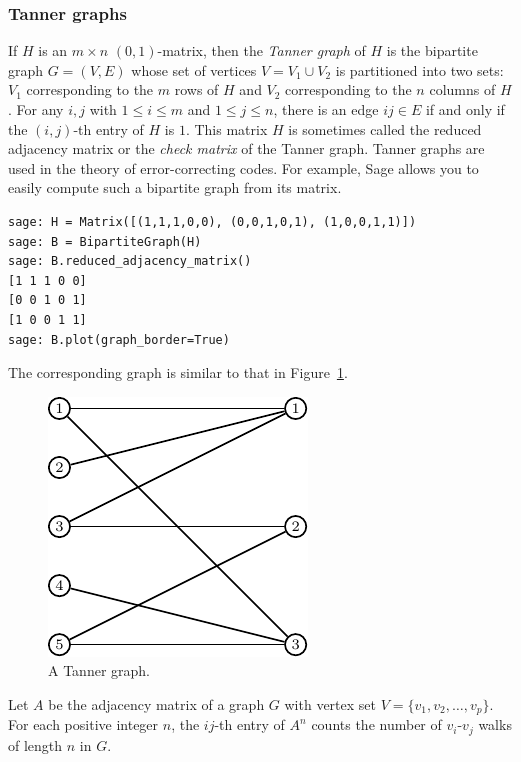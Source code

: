 \subsubsection{Tanner graphs}

If $H$ is an $m \times n$ $(0,1)$-matrix, then the
\emph{Tanner graph} of $H$ is the bipartite graph
$G = (V,E)$ whose set of vertices $V = V_1 \cup V_2$ is partitioned
into two sets: $V_1$ corresponding to the $m$ rows of $H$ and $V_2$
corresponding to the $n$ columns of $H$. For any $i,j$ with
$1 \leq i \leq m$ and $1 \leq j \leq n$, there is an edge $ij \in E$
if and only if the $(i,j)$-th entry of $H$ is $1$. This matrix $H$ is
sometimes called the reduced adjacency matrix or the
\emph{check matrix} of the
Tanner graph. Tanner graphs are used in the theory
of error-correcting codes. For example,
Sage allows you to easily compute such a bipartite graph from its
matrix.
\begin{lstlisting}
sage: H = Matrix([(1,1,1,0,0), (0,0,1,0,1), (1,0,0,1,1)])
sage: B = BipartiteGraph(H)
sage: B.reduced_adjacency_matrix()
[1 1 1 0 0]
[0 0 1 0 1]
[1 0 0 1 1]
sage: B.plot(graph_border=True)
\end{lstlisting}
The corresponding graph is similar to that in
Figure~\ref{fig:introduction:tanner_graph}.

\begin{figure}[!htbp]
\centering
{}
\includegraphics{image/introduction/tanner-graph}
\caption{A Tanner graph.}
\label{fig:introduction:tanner_graph}
\end{figure}

\begin{theorem}
Let $A$ be the adjacency matrix of a graph $G$ with vertex set
$V = \{v_1, v_2, \dots, v_p\}$. For each positive integer $n$, the
$ij$-th entry of $A^n$ counts the number of $v_i$-$v_j$ walks of
length $n$ in $G$.
\end{theorem}

